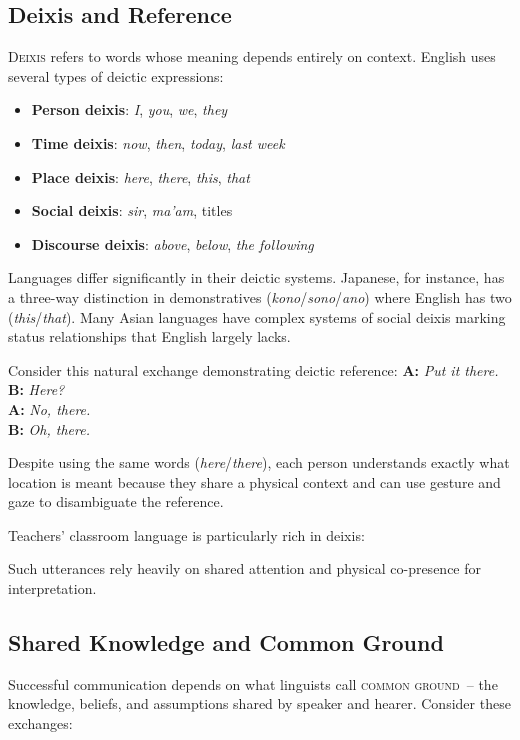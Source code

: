 \subsection{Deixis and Reference}
\textsc{Deixis} refers to words whose meaning depends entirely on context. English uses several types of deictic expressions:

\begin{itemize}
    \item \textbf{Person deixis}: \textit{I}, \textit{you}, \textit{we}, \textit{they}
    \item \textbf{Time deixis}: \textit{now}, \textit{then}, \textit{today}, \textit{last week}
    \item \textbf{Place deixis}: \textit{here}, \textit{there}, \textit{this}, \textit{that}
    \item \textbf{Social deixis}: \textit{sir}, \textit{ma'am}, titles
    \item \textbf{Discourse deixis}: \textit{above}, \textit{below}, \textit{the following}
\end{itemize}

Languages differ significantly in their deictic systems. Japanese, for instance, has a three-way distinction in demonstratives (\textit{kono}/\textit{sono}/\textit{ano}) where English has two (\textit{this}/\textit{that}). Many Asian languages have complex systems of social deixis marking status relationships that English largely lacks.

Consider this natural exchange demonstrating deictic reference:
\ea
    \textbf{A:} \textit{Put it there.}\\
    \textbf{B:} \textit{Here?}\\
    \textbf{A:} \textit{No, there.}\\
    \textbf{B:} \textit{Oh, there.}
\z

Despite using the same words (\textit{here}/\textit{there}), each person understands exactly what location is meant because they share a physical context and can use gesture and gaze to disambiguate the reference.

Teachers' classroom language is particularly rich in deixis:
\ea
    \z
\z

Such utterances rely heavily on shared attention and physical co-presence for interpretation.

\subsection{Shared Knowledge and Common Ground}
Successful communication depends on what linguists call \textsc{common ground}~-- the knowledge, beliefs, and assumptions shared by speaker and hearer. Consider these exchanges:

